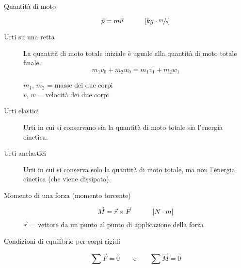 \documentclass[a4paper,11pt,italian]{article}
\begin{document}
\begin{description}
  \item[Quantità di moto] 
  \[ \vec{p} = m \vec{v} \hspace*{3em} \left[ kg \cdot \sfrac{m}{s} \right] \] 


  \item[Urti su una retta] 
  La quantità di moto totale iniziale è uguale alla quantità di moto totale finale.
  \[ m_1 v_0 + m_2 w_0 = m_1 v_1 + m_2 w_1 \]
  \begin{multicols}{2}
  $ m_1 $, $ m_2 $ = masse dei due corpi\\
  $ v $, $ w $ = velocità dei due corpi
  \end{multicols}
  
  \item[Urti elastici] 
  Urti in cui si conservano sia la quantità di moto totale sia l'energia cinetica.
  
  \item[Urti anelastici] 
  Urti in cui si conserva solo la quantità di moto totale, ma non l'energia cinetica (che viene dissipata).


  \item[Momento di una forza (momento torcente)]
  \[ \vec{M} = \vec{r} \times \vec{F} \hspace*{3em} \left[ N \cdot m \right] \]
  $ \vec{r} $ = vettore da un punto al punto di applicazione della forza
  
  \item[Condizioni di equilibrio per corpi rigidi]
  \[ \sum \vec{F} = 0 \quad\quad\textrm{e}\quad\quad \sum \vec{M} = 0 \]


\end{description}
\end{document}

